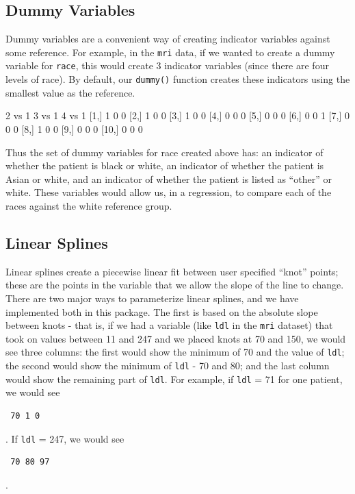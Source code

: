 \documentclass[landscape]{article}
\renewenvironment{Schunk}{\vspace{\topsep}}{\vspace{\topsep}}
\begin{document}
\subsection{Dummy Variables}
Dummy variables are a convenient way of creating indicator variables against some reference. For example, in the \texttt{mri} data, if we wanted to create a dummy variable for \texttt{race}, this would create 3 indicator variables (since there are four levels of race). By default, our \texttt{dummy()} function creates these indicators using the smallest value as the reference. 
\begin{Schunk}
\begin{Soutput}
      2 vs 1 3 vs 1 4 vs 1
 [1,]      1      0      0
 [2,]      1      0      0
 [3,]      1      0      0
 [4,]      0      0      0
 [5,]      0      0      0
 [6,]      0      0      1
 [7,]      0      0      0
 [8,]      1      0      0
 [9,]      0      0      0
[10,]      0      0      0
\end{Soutput}
\end{Schunk}
Thus the set of dummy variables for race created above has: an indicator of whether the patient is black or white, an indicator of whether the patient is Asian or white, and an indicator of whether the patient is listed as ``other'' or white. These variables would allow us, in a regression, to compare each of the races against the white reference group.

\subsection{Linear Splines}
Linear splines create a piecewise linear fit between user specified ``knot'' points; these are the points in the variable that we allow the slope of the line to change. There are two major ways to parameterize linear splines, and we have implemented both in this package. The first is based on the absolute slope between knots - that is, if we had a variable (like \texttt{ldl} in the \texttt{mri} dataset) that took on values between 11 and 247 and we placed knots at 70 and 150, we would see three columns: the first would show the minimum of 70 and the value of \texttt{ldl}; the second would show the minimum of \texttt{ldl} - 70 and 80; and the last column would show the remaining part of \texttt{ldl}. For example, if \texttt{ldl} = 71 for one patient, we would see \begin{verbatim} 70 1 0 \end{verbatim}. If \texttt{ldl} = 247, we would see \begin{verbatim} 70 80 97 \end{verbatim}.
\end{document}
